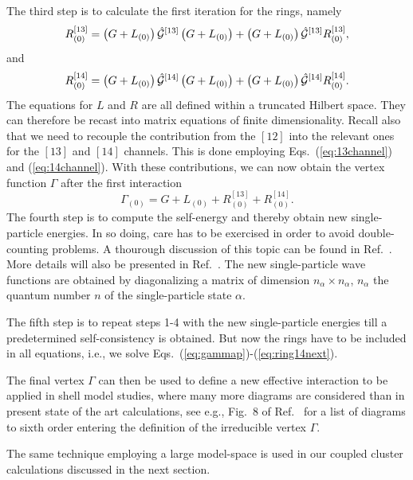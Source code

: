 \documentclass[twoside,12pt]{article}
\begin{document}
The third step is to calculate the first iteration for the  
rings, namely
\begin{equation}
    R_{(0)}^{[13]}=\left(G+L_{(0)}\right)\hat{{\cal G}}^{[13]}
             \left(G+L_{(0)}\right) + 
             \left(G+L_{(0)}\right)\hat{{\cal G}}^{[13]}R_{(0)}^{[13]},
    \label{eq:ring13first}
\end{equation}
and
\begin{equation}
    R_{(0)}^{[14]}=\left(G+L_{(0)}\right)\hat{{\cal G}}^{[14]}
             \left(G+L_{(0)}\right) + 
             \left(G+L_{(0)}\right)\hat{{\cal G}}^{[14]}R_{(0)}^{[14]}.
    \label{eq:ring14first}
\end{equation}
The equations for $L$ and $R$ are all defined within a
truncated Hilbert space. They can therefore be recast into
matrix equations of finite dimensionality.
Recall also  that we need to recouple the contribution
from the $[12]$ into the relevant ones for the $[13]$ and $[14]$
channels. This is done employing Eqs.\ (\ref{eq:13channel}) and
(\ref{eq:14channel}). 
With these contributions, we can now obtain the vertex function
$\Gamma$ after the first interaction
\begin{equation}
    \Gamma_{(0)}=G+L_{(0)}+R_{(0)}^{[13]}+R_{(0)}^{[14]}.
\end{equation}
The fourth step is to compute the self-energy and thereby obtain
new single-particle energies. In so doing, care has to be exercised
in order to avoid double-counting problems. A thourough discussion
of this topic can be found in Ref.\ \cite{jls82}. More details
will also be presented in Ref.\ \cite{mhj99}.
The new single-particle wave functions are obtained
by diagonalizing a matrix of dimension 
$n_{\alpha}\times n_{\alpha}$, $n_{\alpha}$ the quantum
number $n$ of the single-particle state $\alpha$. 

The fifth step is to repeat steps 1-4 with the new single-particle
energies till a predetermined self-consistency is obtained. 
But now the rings have to be included in all equations, i.e.,
we solve Eqs.\ (\ref{eq:gammap})-(\ref{eq:ring14next}). 

The final vertex $\Gamma$ can then be used to define a 
new effective interaction to be applied in shell model studies,
where many more diagrams are considered than in present 
state of the art calculations, see e.g., Fig.\ 8 of Ref.\ \cite{jls82}
for a list of diagrams to sixth order entering the definition
of  the irreducible vertex $\Gamma$. 

The same technique employing a large model-space is used in our 
coupled cluster calculations discussed in the next section.
\end{document}

